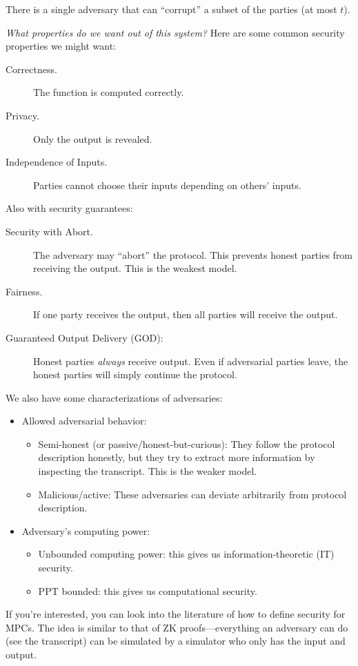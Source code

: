 There is a single adversary that can ``corrupt'' a subset of the parties (at most $t$).

\emph{What properties do we want out of this system?} Here are some common security properties we might want:
\begin{description}
    \item[Correctness.] The function is computed correctly.
    \item[Privacy.] Only the output is revealed.
    \item[Independence of Inputs.] Parties cannot choose their inputs depending on others' inputs.
\end{description}
Also with security guarantees:
\begin{description}
    \item[Security with Abort.] The adversary may ``abort'' the protocol. This prevents honest parties from receiving the output. This is the weakest model.
    \item[Fairness.] If one party receives the output, then all parties will receive the output.
    \item[Guaranteed Output Delivery (GOD):] Honest parties \emph{always} receive output. Even if adversarial parties leave, the honest parties will simply continue the protocol.
\end{description}

We also have some characterizations of adversaries:
\begin{itemize}
    \item Allowed adversarial behavior:
          \begin{itemize}
              \item Semi-honest (or passive/honest-but-curious): They follow the protocol description honestly, but they try to extract more information by inspecting the transcript. This is the weaker model.
              \item Malicious/active: These adversaries can deviate arbitrarily from protocol description.
          \end{itemize}
    \item Adversary's computing power:
          \begin{itemize}
              \item Unbounded computing power: this gives us information-theoretic (IT) security.
              \item PPT bounded: this gives us computational security.
          \end{itemize}
\end{itemize}

If you're interested, you can look into the literature of how to define security for MPCs. The idea is similar to that of ZK proofs---everything an adversary can do (see the transcript) can be simulated by a simulator who only has the input and output.